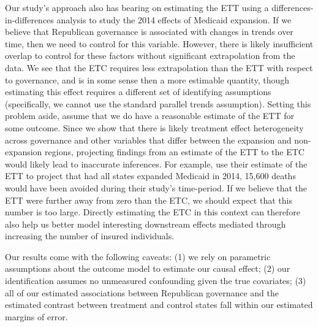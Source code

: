 \documentclass[12pt]{article}
\begin{document}
Our study's approach also has bearing on estimating the ETT using a differences-in-differences analysis to study the 2014 effects of Medicaid expansion. If we believe that Republican governance is associated with changes in trends over time, then we need to control for this variable. However, there is likely insufficient overlap to control for these factors without significant extrapolation from the data. We see that the ETC requires less extrapolation than the ETT with respect to governance, and is in some sense then a more estimable quantity, though estimating this effect requires a different set of identifying assumptions (specifically, we cannot use the standard parallel trends assumption). Setting this problem aside, assume that we do have a reasonable estimate of the ETT for some outcome. Since we show that there is likely treatment effect heterogeneity across governance and other variables that differ between the expansion and non-expansion regions, projecting findings from an estimate of the ETT to the ETC would likely lead to inaccurate inferences. For example, \cite{miller2019medicaid} use their estimate of the ETT to project that had all states expanded Medicaid in 2014, 15,600 deaths would have been avoided during their study's time-period. If we believe that the ETT were further away from zero than the ETC, we should expect that this number is too large. Directly estimating the ETC in this context can therefore also help us better model interesting downstream effects mediated through increasing the number of insured individuals. 

Our results come with the following caveats: (1) we rely on parametric assumptions about the outcome model to estimate our causal effect; (2) our identification assumes no unmeasured confounding given the true covariates; (3) all of our estimated associations between Republican governance and the estimated contrast between treatment and control states fall within our estimated margins of error. 
\end{document}
